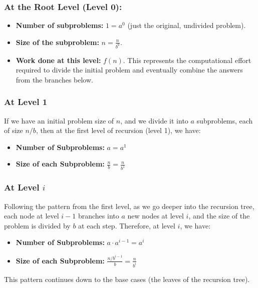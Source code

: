 \subsubsection*{At the Root Level (Level 0):}
\begin{itemize}
    \item \textbf{Number of subproblems:} $1 = a^0$ (just the original, undivided problem).
    \item \textbf{Size of the subproblem:} $n = \frac{n}{b^0}$.
    \item \textbf{Work done at this level:} $f(n)$. This represents the computational effort required to divide the initial problem and eventually combine the answers from the branches below.
\end{itemize}

\subsubsection*{At Level 1}
If we have an initial problem size of $n$, and we divide it into $a$ subproblems, each of size $n/b$, then at the first level of recursion (level 1), we have:
\begin{itemize}
    \item \textbf{Number of Subproblems:} $a = a^1$
    \item \textbf{Size of each Subproblem:} $\frac{n}{b} = \frac{n}{b^1}$
\end{itemize}

\subsubsection*{At Level $i$}
Following the pattern from the first level, as we go deeper into the recursion tree, each node at level $i-1$ branches into $a$ new nodes at level $i$, and the size of the problem is divided by $b$ at each step. Therefore, at level $i$, we have:
\begin{itemize}
    \item \textbf{Number of Subproblems:} $a \cdot a^{i-1} = a^i$
    \item \textbf{Size of each Subproblem:} $\frac{n/b^{i-1}}{b} = \frac{n}{b^i}$
\end{itemize}

This pattern continues down to the base cases (the leaves of the recursion tree). 


